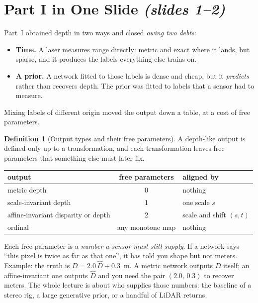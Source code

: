 \documentclass[11pt,a4paper]{article}
\numberwithin{equation}{section}
\newcommand{\slides}[1]{\texorpdfstring{\;\emph{(slides #1)}}{ (slides #1)}}
\theoremstyle{plain}
\theoremstyle{definition}
\newtheorem{definition}[theorem]{Definition}
\begin{document}
\section*{Part I in One Slide \slides{1--2}}
Part~I obtained depth in two ways and closed \emph{owing two debts}:
\begin{itemize}[nosep]
  \item \textbf{Time.} A laser measures range directly: metric and exact where it lands, but sparse, and it produces the labels everything else trains on.
  \item \textbf{A prior.} A network fitted to those labels is dense and cheap, but it \emph{predicts} rather than recovers depth. The prior was fitted to labels that a sensor had to measure.
\end{itemize}
Mixing labels of different origin moved the output down a table, at a cost of free parameters.

\begin{definition}[Output types and their free parameters]
A depth-like output is defined only up to a transformation, and each transformation leaves free parameters that something else must later fix.
\begin{center}\small
\begin{tabular}{@{}lcl@{}}\toprule
output & free parameters & aligned by\\\midrule
metric depth & 0 & nothing\\
scale-invariant depth & 1 & one scale $s$\\
affine-invariant disparity or depth & 2 & scale and shift $(s,t)$\\
ordinal & any monotone map & nothing\\\bottomrule
\end{tabular}
\end{center}
\end{definition}

\begin{intuition}
Each free parameter is a \emph{number a sensor must still supply}. If a network says ``this pixel is twice as far as that one'', it has told you shape but not meters. Example: the truth is $D=2.0\,\hat D+0.3$~m. A metric network outputs $D$ itself; an affine-invariant one outputs $\hat D$ and you need the pair $(2.0,\,0.3)$ to recover meters. The whole lecture is about who supplies those numbers: the baseline of a stereo rig, a large generative prior, or a handful of LiDAR returns.
\end{intuition}
\end{document}

